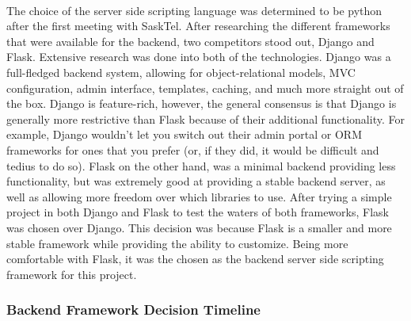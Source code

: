 \documentclass[12pt]{article}
\begin{document}
	\paragraph{}
		The choice of the server side scripting language was determined to be python after the first meeting with SaskTel. After researching the different frameworks that were available for the backend, two competitors stood out, Django and Flask. Extensive research was done into both of the technologies. Django was a full-fledged backend system, allowing for object-relational models, MVC configuration, admin interface, templates, caching, and much more straight out of the box. Django is feature-rich, however, the general consensus is that Django is generally more restrictive than Flask because of their additional functionality. For example, Django wouldn't let you switch out their admin portal or ORM frameworks for ones that you prefer (or, if they did, it would be difficult and tedius to do so). Flask on the other hand, was a minimal backend providing less functionality, but was extremely good at providing a stable backend server, as well as allowing more freedom over which libraries to use. After trying a simple project in both Django and Flask to test the waters of both frameworks, Flask was chosen over Django. This decision was because Flask is a smaller and more stable framework while providing the ability to customize. Being more comfortable with Flask, it was the chosen as the backend server side scripting framework for this project.


	\subsubsection{Backend Framework Decision Timeline}

\end{document}

